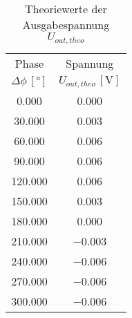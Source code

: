\begin{table}[!h]
	\centering
	\begin{tabular}{|c|c|}
		\hline
		Phase & Spannung\\
		$\Delta\phi\,[\si{\degree}]$ & $U_{out, theo}\,[\si{\volt}]$\\\hline\hline
		\num{0.000}  & \num{0.000} \\
		\num{30.000}  & \num{0.003} \\
		\num{60.000}  & \num{0.006} \\
		\num{90.000}  & \num{0.006} \\
		\num{120.000}  & \num{0.006} \\
		\num{150.000}  & \num{0.003} \\
		\num{180.000}  & \num{0.000} \\
		\num{210.000}  & \num{-0.003} \\
		\num{240.000}  & \num{-0.006} \\
		\num{270.000}  & \num{-0.006} \\
		\num{300.000}  & \num{-0.006} \\
		\hline
	\end{tabular}
	\caption{Theoriewerte der Ausgabespannung $U_{out, theo}$ \label{tab:Uout_Theo}}
\end{table}